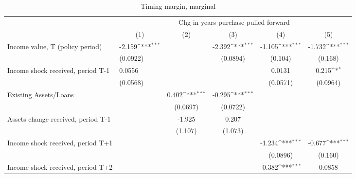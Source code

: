 \begin{table}[htbp]\centering
\def\sym#1{\ifmmode^{#1}\else\(^{#1}\)\fi}
\caption{Timing margin, marginal}
\begin{tabular}{p{1.2in}l*{4}{c}}
\hline\hline
                    &\multicolumn{5}{c}{Chg in years purchase pulled forward}                                                     \\\cmidrule(lr){2-6}
                    &\multicolumn{1}{c}{(1)}         &\multicolumn{1}{c}{(2)}         &\multicolumn{1}{c}{(3)}         &\multicolumn{1}{c}{(4)}         &\multicolumn{1}{c}{(5)}         \\
\hline
Income value, T (policy period)&      -2.159\sym{***}&                     &      -2.392\sym{***}&      -1.105\sym{***}&      -1.732\sym{***}\\
                    &    (0.0922)         &                     &    (0.0894)         &     (0.104)         &     (0.168)         \\
Income shock received, period T-1&      0.0556         &                     &                     &      0.0131         &       0.215\sym{*}  \\
                    &    (0.0568)         &                     &                     &    (0.0571)         &    (0.0964)         \\
Existing Assets/Loans&                     &       0.402\sym{***}&      -0.295\sym{***}&                     &                     \\
                    &                     &    (0.0697)         &    (0.0722)         &                     &                     \\
Assets change received, period T-1&                     &      -1.925         &       0.207         &                     &                     \\
                    &                     &     (1.107)         &     (1.073)         &                     &                     \\
Income shock received, period T+1&                     &                     &                     &      -1.234\sym{***}&      -0.677\sym{***}\\
                    &                     &                     &                     &    (0.0896)         &     (0.160)         \\
Income shock received, period T+2&                     &                     &                     &      -0.382\sym{***}&      0.0858         \\

\end{tabular}
\end{table}

